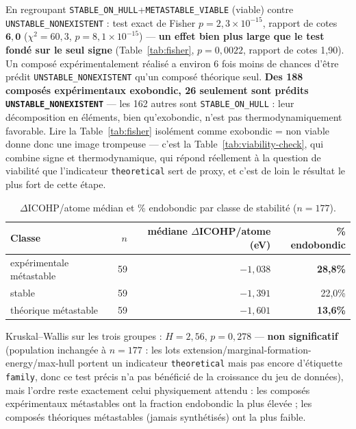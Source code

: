 \documentclass[11pt,a4paper]{article}
\begin{document}
En regroupant \texttt{STABLE\_ON\_HULL}+\texttt{METASTABLE\_VIABLE}
(\og{}viable\fg{}) contre \texttt{UNSTABLE\_NONEXISTENT} : test exact de
Fisher $p=2,3\times10^{-15}$, rapport de cotes $\mathbf{6,0}$
($\chi^2=60,3$, $p=8,1\times10^{-15}$) --- \textbf{un effet bien plus
large que le test fondé sur le seul signe} (Table~\ref{tab:fisher},
$p=0,0022$, rapport de cotes 1,90). Un composé expérimentalement réalisé
a environ 6 fois moins de chances d'être prédit
\texttt{UNSTABLE\_NONEXISTENT} qu'un composé théorique seul. \textbf{Des
188 composés expérimentaux exobondic, 26 seulement sont prédits
\texttt{UNSTABLE\_NONEXISTENT}} --- les 162 autres sont
\texttt{STABLE\_ON\_HULL} : leur décomposition en éléments, bien
qu'exobondic, n'est pas thermodynamiquement favorable. Lire la
Table~\ref{tab:fisher} isolément comme \og{}exobondic = non viable\fg{}
donne donc une image trompeuse --- c'est la Table~\ref{tab:viability-check},
qui combine signe et thermodynamique, qui répond réellement à la
question de viabilité que l'indicateur \texttt{theoretical} sert de
proxy, et c'est de loin le résultat le plus fort de cette étape.

\begin{table}[htbp]
\centering
\caption{$\Delta$ICOHP/atome médian et \% endobondic par classe de stabilité ($n=177$).}
\label{tab:family-breakdown}
\begin{tabular}{@{}lrrr@{}}
\toprule
Classe & $n$ & médiane $\Delta$ICOHP/atome (eV) & \% endobondic \\
\midrule
expérimentale métastable & 59 & $-1,038$ & \textbf{28,8\%} \\
stable & 59 & $-1,391$ & 22,0\% \\
théorique métastable & 59 & $-1,601$ & \textbf{13,6\%} \\
\bottomrule
\end{tabular}
\end{table}

Kruskal--Wallis sur les trois groupes : $H=2,56$, $p=0,278$ ---
\textbf{non significatif} (population inchangée à $n=177$ : les lots
extension/marginal-formation-energy/max-hull portent un indicateur
\texttt{theoretical} mais pas encore d'étiquette \texttt{family}, donc
ce test précis n'a pas bénéficié de la croissance du jeu de données),
mais l'ordre reste exactement celui physiquement attendu : les composés
expérimentaux métastables ont la fraction endobondic la plus élevée ;
les composés théoriques métastables (jamais synthétisés) ont la plus
faible.
\end{document}
